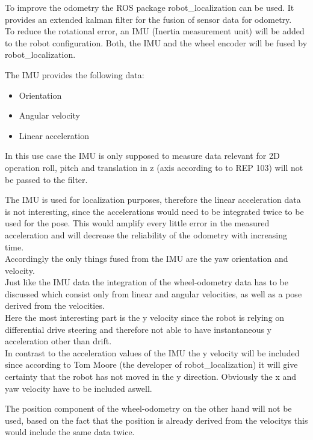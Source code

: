 To improve the odometry the ROS package robot\_localization can be used. It provides an extended kalman filter for the fusion of sensor data for odometry.\\

To reduce the rotational error, an IMU (Inertia measurement unit) will be added to the robot configuration. Both, the IMU and the wheel encoder will be fused by robot\_localization.

The IMU provides the following data:
\begin{itemize}
	\item Orientation
	\item Angular velocity
	\item Linear acceleration
\end{itemize}

In this use case the IMU is only supposed to measure data relevant for 2D operation roll, pitch and translation in z (axis according to to REP 103) will not be passed to the filter. 

The IMU is used for localization purposes, therefore the linear acceleration data is not interesting, since the accelerations would need to be integrated twice to be used for the pose. This would amplify every little error in the measured acceleration and will decrease the reliability of the odometry with increasing time.\\

Accordingly the only things fused from the IMU are the yaw orientation and velocity.\\

Just like the IMU data the integration of the wheel-odometry data has to be discussed which consist only from linear and angular velocities, as well as a pose derived from the velocities.\\

Here the most interesting part is the y velocity since the robot is relying on differential drive steering and therefore not able to have instantaneous y acceleration other than drift.\\

In contrast to the acceleration values of the IMU the y velocity will be included since according to Tom Moore (the developer of robot\_localization) it will give certainty that the robot has not moved in the y direction\cite{robotlocalizationconfiguration}. Obviously the x and yaw velocity have to be included aswell.

The position component of the wheel-odometry on the other hand will not be used, based on the fact that the position is already derived from the velocitys this would include the same data twice.\\

